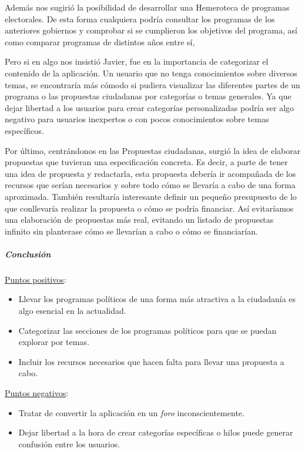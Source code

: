 Además nos sugirió la posibilidad de desarrollar una Hemeroteca de programas electorales. De esta forma cualquiera podría consultar los programas de los anteriores gobiernos y comprobar si se cumplieron los objetivos del programa, así como comparar programas de distintos años entre sí, 

Pero si en algo nos insistió Javier, fue en la importancia de categorizar el contenido de la aplicación. Un usuario que no tenga conocimientos sobre diversos temas, se encontraría más cómodo si pudiera visualizar las diferentes partes de un programa o las propuestas ciudadanas por categorías o temas generales. Ya que dejar libertad a los usuarios para crear categorías personalizadas podría ser algo negativo para usuarios inexpertos o con pocos conocimientos sobre temas específicos.

Por último, centrándonos en las Propuestas ciudadanas, surgió la idea de elaborar propuestas que tuvieran una especificación concreta. Es decir, a parte de tener una idea de propuesta y redactarla, esta propuesta debería ir acompañada de los recursos que serían necesarios y sobre todo cómo se llevaría a cabo de una forma aproximada. También resultaría interesante definir un pequeño presupuesto de lo que conllevaría realizar la propuesta o cómo se podría financiar. Así evitaríamos una elaboración de propuestas más real, evitando un listado de propuestas infinito sin planterase cómo se llevarían a cabo o cómo se financiarían.

\subparagraph{Conclusión}

\underline{Puntos positivos}:

\begin{itemize}
  \item Llevar los programas políticos de una forma más atractiva a la ciudadanía es algo esencial en la actualidad.
  \item Categorizar las secciones de los programas políticos para que se puedan explorar por temas.
  \item Incluir los recursos necesarios que hacen falta para llevar una propuesta a cabo.
\end{itemize}

\underline{Puntos negativos}:

\begin{itemize}
  \item Tratar de convertir la aplicación en un \textit{foro} inconscientemente.
  \item Dejar libertad a la hora de crear categorías específicas o hilos puede generar confusión entre los usuarios. 
\end{itemize}

